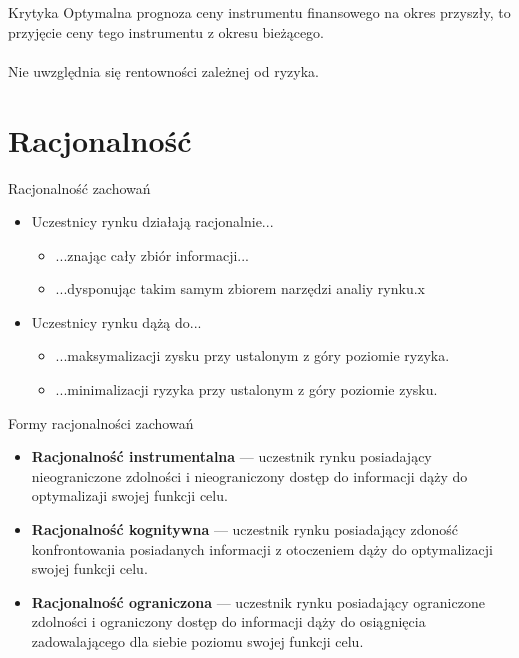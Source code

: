 \documentclass[a4paper, 11pt]{beamer}
\begin{document}
	\begin{frame}{Krytyka}
		Optymalna prognoza ceny instrumentu finansowego na okres przyszły, to przyjęcie ceny tego instrumentu z okresu bieżącego.
		\\~\\
		Nie uwzględnia się rentowności zależnej od ryzyka.
	\end{frame}
	
	\section{Racjonalność}
	
	\begin{frame}{Racjonalność zachowań}
		\begin{itemize}
			\item Uczestnicy rynku działają racjonalnie...
			\begin{itemize}
				\item ...znając cały zbiór informacji...
				\item ...dysponując takim samym zbiorem narzędzi analiy rynku.x
			\end{itemize}
			\item Uczestnicy rynku dążą do...
			\begin{itemize}
				\item ...maksymalizacji zysku przy ustalonym z góry poziomie ryzyka.
				\item ...minimalizacji ryzyka przy ustalonym z góry poziomie zysku.
			\end{itemize}
		\end{itemize}
	\end{frame}
	
	\begin{frame}{Formy racjonalności zachowań}
		\begin{itemize}
			\item \textbf{Racjonalność instrumentalna} --- uczestnik rynku posiadający
				nieograniczone zdolności i nieograniczony dostęp do informacji dąży
				do optymalizaji swojej funkcji celu.
			\item \textbf{Racjonalność kognitywna} --- uczestnik rynku posiadający zdoność
				konfrontowania posiadanych informacji z otoczeniem dąży do optymalizacji swojej
				funkcji celu.
			\item \textbf{Racjonalność ograniczona} --- uczestnik rynku posiadający
				ograniczone zdolności i ograniczony dostęp do informacji dąży do osiągnięcia
				zadowalającego dla siebie poziomu swojej funkcji celu.
			\end{itemize}
	\end{frame}
	
\end{document}
